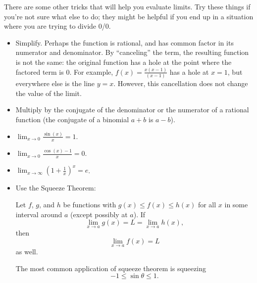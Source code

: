 There are some other tricks that will help you evaluate limits. Try these things if you're not sure what else to do; they might be helpful if you end up in a situation where you are trying to divide 0/0.
\begin{itemize}
\item Simplify. Perhaps the function is rational, and has common factor in its numerator and denominator. By ``canceling'' the term, the resulting function is not the same: the original function has a hole at the point where the factored term is 0. For example, $f(x)=\frac{x(x-1)}{(x-1)}$ has a hole at $x=1$, but everywhere else is the line $y=x$. However, this cancellation does not change the value of the limit.
\item Multiply by the conjugate of the denominator or the numerator of a rational function (the conjugate of a binomial $a+b$ is $a-b$).
\item $\displaystyle\lim_{x\to 0}\frac{\sin(x)}{x} = 1$.
\item $\displaystyle\lim_{x\to 0}\frac{\cos(x) - 1}{x} = 0$.
\item $\displaystyle\lim_{x\to\infty}\left(1+\frac{1}{x}\right)^x = e$.

\item Use the Squeeze Theorem:

\begin{thm}
Let $f$, $g$, and $h$ be functions with $g(x)\leq f(x)\leq h(x)$ for all $x$ in some interval around $a$ (except possibly at $a$). If $$\lim_{x\to a}g(x)=L=\lim_{x\to a} h(x),$$ then $$\lim_{x\to a} f(x)=L$$
as well.
\end{thm}
The most common application of squeeze theorem is squeezing $$-1\leq \sin\theta \leq 1.$$
\end{itemize}

